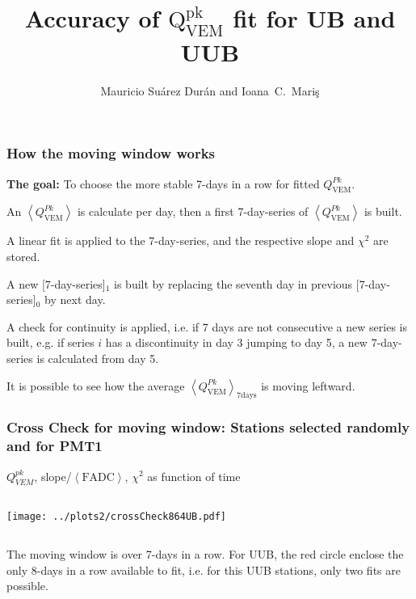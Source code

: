 \documentclass[aspectratio=169]{beamer}
\title{Accuracy of $\mathrm{Q}^{\mathrm{pk}}_{\mathrm{VEM}}$ fit for UB and UUB}
\author{
  Mauricio Su\'arez Dur\'an and Ioana~C.~Mari\c{s}
}
\institute{IIHE-ULB}
\begin{document}
\begin{frame}
  \titlepage
\end{frame}

\begin{frame}
  \frametitle{How the moving window works}
  {\bf The goal:} To choose the more stable 7-days in a row for
  fitted $Q^{Pk}_{\mathrm{VEM}}$.
  \vspace{0.2cm}
  \begin{enumerate}
      {\footnotesize
    \item An $\left<Q^{Pk}_{\mathrm{VEM}}\right>$ is calculate
      per day, then a first 7-day-series of
      $\left<Q^{Pk}_{\mathrm{VEM}}\right>$ is built.
    \item A linear fit is applied to the 7-day-series, and
      the respective slope and $\chi^2$ are stored.
    \item A new [7-day-series]$_1$ is built by replacing the
      seventh day in previous [7-day-series]$_0$ by next day.
    \item A check for continuity is applied, i.e. if 7 days are
      not consecutive a new series is built, e.g. if series
      $i$ has a discontinuity in day 3 jumping to day 5, a new
      7-day-series is calculated from day 5.
      }
  \end{enumerate}
  \begin{center}
  \end{center}
  {\scriptsize It is possible to see how the average
  $\left<Q^{Pk}_{\mathrm{VEM}}\right>_{7\mathrm{days}}$ is moving
  leftward.}
\end{frame}


\begin{frame}
  \frametitle{Cross Check for moving window: Stations selected
  randomly and for PMT1}
  $Q^{pk}_{VEM}$, slope/$\left<\mathrm{FADC}\right>$, $\chi^2$ as
  function of time
  \vspace{0.5cm}
  \begin{columns}
    \begin{column}{0.5\textwidth}
      \texttt{[image: ../plots2/crossCheck864UB.pdf]}
    \end{column}
    \begin{column}{0.5\textwidth}
    \end{column}
  \end{columns}
  \vspace{0.3cm}

  The moving window is over 7-days in a row. For UUB, the red
  circle enclose the only 8-days in a row available to fit, i.e.
  for this UUB stations, only two fits are possible.
\end{frame}
\end{document}
